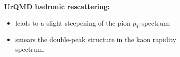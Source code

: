 \documentclass[dvipsnames] {beamer}
\begin{document}
\begin{frame}
\begin{columns}[c]
\begin{block}{\bf {}}
\begin{figure}[H]
   \end{figure}
  \end{block}
  \begin{block}{\bf \centering UrQMD hadronic rescattering:}
     {\footnotesize \bf
    \begin{itemize}
    \item leads to a slight steepening of the pion $p_{T}$-spectrum.
    \item smears the double-peak structure in the kaon rapidity spectrum.
    \end{itemize}
    }
  \end{block}
  \end{columns}
\end{frame}
\end{document}
